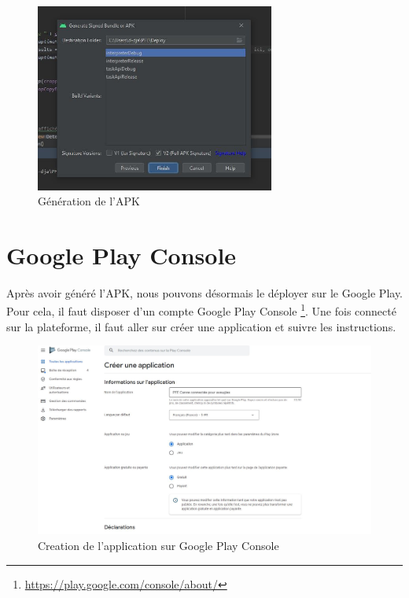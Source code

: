 \documentclass[UTF8]{EPURapport}
\begin{document}
\begin{figure}[h!]
\centering
  \includegraphics[width=0.7\textwidth]{images/generateAPK.jpg}
  \caption{Génération de l'APK}
  \label{fig:genapk}
\end{figure}

\section{Google Play Console}

Après avoir généré l'APK, nous pouvons désormais le déployer sur le Google Play. Pour cela, il faut disposer d'un compte Google Play Console \footnote{\url{https://play.google.com/console/about/}}. Une fois connecté sur la plateforme, il faut aller sur créer une application et suivre les instructions.

\begin{figure}[h!]
\centering
  \includegraphics[width=1\textwidth]{images/CreateAppConsole.JPG}
  \caption{Creation de l'application sur Google Play Console}
  \label{fig:createappconsole}
\end{figure}
\end{document}
